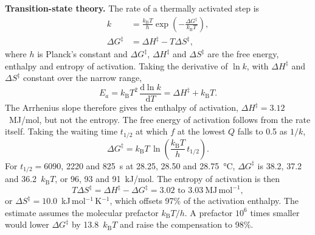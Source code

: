 \documentclass[11pt]{article}
\begin{document}
\textbf{Transition-state theory.} The rate of a thermally activated step is
\begin{align}
 k&=\frac{k_\mathrm{B}T}{h}\exp\!\left(-\frac{\Delta G^\ddagger}{k_\mathrm{B}T}\right),\label{eq:si-eyring}\\
 \Delta G^\ddagger&=\Delta H^\ddagger-T\Delta S^\ddagger,\label{eq:si-dg}
\end{align}
where $h$ is Planck's constant and $\Delta G^\ddagger$, $\Delta H^\ddagger$ and $\Delta S^\ddagger$ are the free energy, enthalpy and entropy of activation. Taking the derivative of $\ln k$, with $\Delta H^\ddagger$ and $\Delta S^\ddagger$ constant over the narrow range,
\begin{equation}
 E_a=k_\mathrm{B}T^2\,\frac{\mathrm{d}\ln k}{\mathrm{d}T}=\Delta H^\ddagger+k_\mathrm{B}T.
 \label{eq:si-dh}
\end{equation}
The Arrhenius slope therefore gives the enthalpy of activation, $\Delta H^\ddagger=3.12$~MJ/mol, but not the entropy. The free energy of activation follows from the rate itself. Taking the waiting time $t_{1/2}$ at which $f$ at the lowest $Q$ falls to 0.5 as $1/k$,
\begin{equation}
 \Delta G^\ddagger=k_\mathrm{B}T\,\ln\!\left(\frac{k_\mathrm{B}T}{h}\,t_{1/2}\right).
 \label{eq:si-dgnum}
\end{equation}
For $t_{1/2}=6090$, 2220 and \SI{825}{\second} at 28.25, 28.50 and \SI{28.75}{\degreeCelsius}, $\Delta G^\ddagger$ is 38.2, 37.2 and 36.2~$k_\mathrm{B}T$, or 96, 93 and 91~kJ/mol. The entropy of activation is then
\begin{equation}
 T\Delta S^\ddagger=\Delta H^\ddagger-\Delta G^\ddagger=3.02\text{ to }3.03~\mathrm{MJ\,mol^{-1}},
 \label{eq:si-ds}
\end{equation}
or $\Delta S^\ddagger=10.0$~kJ\,mol$^{-1}$\,K$^{-1}$, which offsets 97\% of the activation enthalpy. The estimate assumes the molecular prefactor $k_\mathrm{B}T/h$. A prefactor $10^{6}$ times smaller would lower $\Delta G^\ddagger$ by 13.8~$k_\mathrm{B}T$ and raise the compensation to 98\%.
\end{document}
